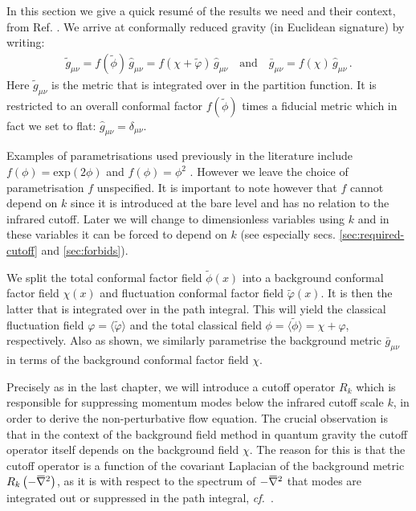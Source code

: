 \documentclass[11pt]{book}
\newcommand{\overbar}[1]{\mkern 1.5mu\overline{\mkern-1.5mu#1\mkern-1.5mu}\mkern 1.5mu}
\newcommand{\bnabla}{\overbar \nabla}
\newcommand\cf{\textit{cf.}\ }
\newcommand{\vp}{\varphi}
\numberwithin{equation}{chapter}
\begin{document}
In this section we give a quick resum\'e of the results we need and their context,
from Ref. \cite{Dietz:2015owa}.
We arrive at conformally reduced gravity (in Euclidean signature) by writing:
\begin{align}
  \tilde g_{\mu\nu} = f(\tilde\phi) \, \hat g_{\mu\nu}
                    = f(\chi +\tilde\varphi ) \, \hat g_{\mu\nu}
  \quad \text{and} \quad
  \bar g_{\mu\nu} = f(\chi) \, \hat g_{\mu\nu} \,.
  \label{conformal-reduction}
\end{align}
Here $\tilde g_{\mu\nu}$ is the metric that is integrated over in the partition function.
It is restricted to an overall conformal factor $f(\tilde\phi)$ times a fiducial metric which
in fact we set to flat: $\hat g_{\mu\nu}=\delta_{\mu\nu}$.

Examples of parametrisations used previously in the literature include
$f(\phi) = \mathrm{exp}(2\phi)$ \cite{Machado:2009ph} and
$f(\phi) = \phi^2$ \cite{Manrique:2009uh, Bonanno:2012dg}.
However we leave the choice of parametrisation $f$ unspecified.
It is important to note however that $f$ cannot depend on $k$ since it is introduced at the bare level
and has no relation to the infrared cutoff.
Later we will change to dimensionless variables using $k$ and in these variables it can be forced
to depend on $k$ (see especially secs. \ref{sec:required-cutoff} and \ref{sec:forbids}).

We split the total conformal factor field $\tilde\phi(x)$ into a background conformal factor
field $\chi(x)$ and fluctuation conformal factor field $\tilde\vp(x)$.
It is then the latter that is integrated over in the path integral.
This will yield the classical fluctuation field $\vp = \langle \tilde \vp \rangle$ and the total classical
field $\phi = \langle \tilde \phi \rangle = \chi + \vp$, respectively.
Also as shown, we similarly parametrise the background
metric $\bar{g}_{\mu\nu}$ in terms of the background conformal factor field $\chi$.

Precisely as in the last chapter, we will introduce a cutoff operator $R_k$
which is responsible for suppressing momentum modes below the infrared cutoff scale $k$,
in order to derive the non-perturbative flow equation.
The crucial observation is that in the context of the background field method in quantum gravity the
cutoff operator itself depends on the background field $\chi$.
The reason for this is that the cutoff operator is a function of the covariant Laplacian of the
background metric $R_k\left(-\bnabla^2\right)$, as it is with respect to the spectrum of
$-\bnabla^2$ that modes are integrated out or suppressed in the path integral,
\cf \cite{Reuter:2008wj,Reuter:2009kq}.
\end{document}

